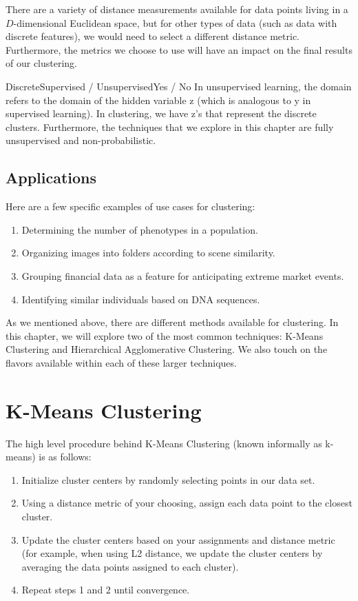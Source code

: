 There are a variety of distance measurements available for data points living in a $D$-dimensional Euclidean space, but for other types of data (such as data with discrete features), we would need to select a different distance metric. Furthermore, the metrics we choose to use will have an impact on the final results of our clustering.

\begin{mlcube}[clustering]{Discrete}{Supervised / Unsupervised}{Yes / No}
	In unsupervised learning, the domain refers to the domain of the hidden variable z (which is analogous to y in supervised learning). In clustering, we have z's that represent the discrete clusters. Furthermore, the techniques that we explore in this chapter are fully unsupervised and non-probabilistic.
\end{mlcube}

\subsection{Applications}
Here are a few specific examples of use cases for clustering:

\begin{enumerate}
    \item Determining the number of phenotypes in a population.
    \item Organizing images into folders according to scene similarity.
    \item Grouping financial data as a feature for anticipating extreme market events.
    \item Identifying similar individuals based on DNA sequences.
\end{enumerate}

As we mentioned above, there are different methods available for clustering. In this chapter, we will explore two of the most common techniques: K-Means Clustering and Hierarchical Agglomerative Clustering. We also touch on the flavors available within each of these larger techniques.

\section{K-Means Clustering}
The high level procedure behind K-Means Clustering (known informally as k-means) is as follows:

\begin{enumerate}
    \item Initialize cluster centers by randomly selecting points in our data set.
    \item Using a distance metric of your choosing, assign each data point to the closest cluster.
    \item Update the cluster centers based on your assignments and distance metric (for example, when using L2 distance, we update the cluster centers by averaging the data points assigned to each cluster).
    \item Repeat steps 1 and 2 until convergence.
\end{enumerate}

